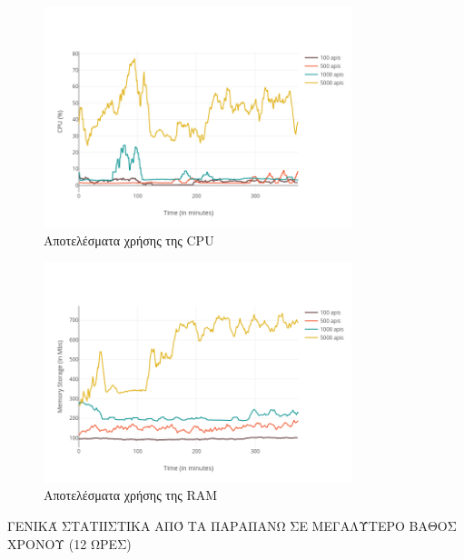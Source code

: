 \begin{figure}[!ht]
	\centering
	\includegraphics[width=0.8\textwidth]{./images/chapter5/cpu-plot.png}
	\caption[Αποτελέσματα χρήσης της CPU]{Αποτελέσματα χρήσης της CPU}
	\label{fig:cpu_usage}
\end{figure}

\begin{figure}[!ht]
	\centering
	\includegraphics[width=0.8\textwidth]{./images/chapter5/memory-plot.png}
	\caption[Αποτελέσματα χρήσης της RAM]{Αποτελέσματα χρήσης της RAM}
	\label{fig:ram_usage}
\end{figure}

ΓΕΝΙΚΆ ΣΤΑΤΙΙΣΤΙΚΑ ΑΠΌ ΤΑ ΠΑΡΑΠΑΝΩ ΣΕ ΜΕΓΑΛΎΤΕΡΟ ΒΑΘΟΣ ΧΡΟΝΟΥ (12 ΩΡΕΣ)

